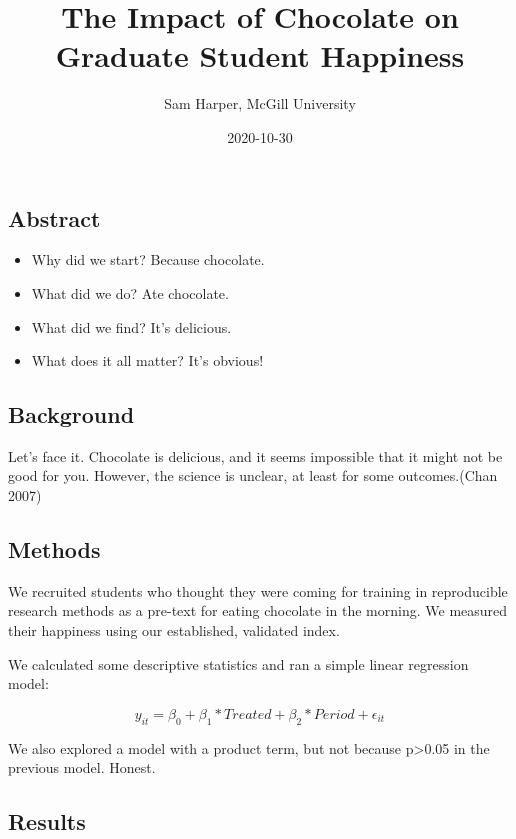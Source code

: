 \documentclass[
]{article}
\title{The Impact of Chocolate on Graduate Student Happiness}
\author{Sam Harper, McGill University}
\date{2020-10-30}
\providecommand{\tightlist}{%
  \setlength{\itemsep}{0pt}\setlength{\parskip}{0pt}}
\begin{document}
\maketitle

\hypertarget{abstract}{%
\subsection{Abstract}\label{abstract}}

\begin{itemize}
\tightlist
\item
  Why did we start? Because chocolate.
\item
  What did we do? Ate chocolate.
\item
  What did we find? It's delicious.
\item
  What does it all matter? It's obvious!
\end{itemize}

\hypertarget{background}{%
\subsection{Background}\label{background}}

Let's face it. Chocolate is delicious, and it seems impossible that it
might not be good for you. However, the science is unclear, at least for
some outcomes.(Chan 2007)

\hypertarget{methods}{%
\subsection{Methods}\label{methods}}

We recruited students who thought they were coming for training in
reproducible research methods as a pre-text for eating chocolate in the
morning. We measured their happiness using our established, validated
index.

We calculated some descriptive statistics and ran a simple linear
regression model:

\[
y_{it}=\beta_{0} + \beta_{1}*Treated + \beta_{2}*Period + \epsilon_{it}
\]

We also explored a model with a product term, but not because
p\textgreater0.05 in the previous model. Honest.

\hypertarget{results}{%
\subsection{Results}\label{results}}
\end{document}
